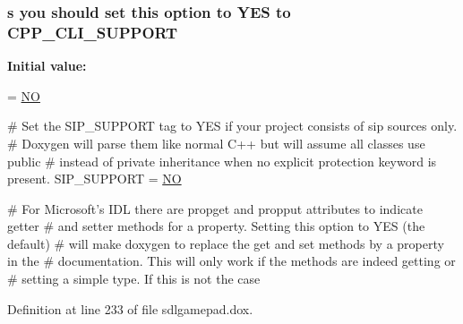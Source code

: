 \hypertarget{sdlgamepad_8dox_ad95e419f1790fce508581809c7b5dd7f}{
\subsubsection[{C\-P\-P\-\_\-\-C\-L\-I\-\_\-\-S\-U\-P\-P\-O\-R\-T}]{ {\bf s} you should {\bf set} this option to Y\-E\-S to C\-P\-P\-\_\-\-C\-L\-I\-\_\-\-S\-U\-P\-P\-O\-R\-T}}\label{sdlgamepad_8dox_ad95e419f1790fce508581809c7b5dd7f}
{\bfseries Initial value\-:}
\begin{DoxyCode}
= \hyperlink{sdlgamepad_8dox_a0f6a46245280dc38baf9600906aa1393}{NO}

\textcolor{preprocessor}{# Set the SIP\_SUPPORT tag to YES if your project consists of sip sources only.}
\textcolor{preprocessor}{}\textcolor{preprocessor}{# Doxygen will parse them like normal C++ but will assume all classes use public}
\textcolor{preprocessor}{}\textcolor{preprocessor}{# instead of private inheritance when no explicit protection keyword is present.}
\textcolor{preprocessor}{}
SIP\_SUPPORT            = \hyperlink{sdlgamepad_8dox_a0f6a46245280dc38baf9600906aa1393}{NO}

\textcolor{preprocessor}{# For Microsoft's IDL there are propget and propput attributes to indicate getter}
\textcolor{preprocessor}{}\textcolor{preprocessor}{# and setter methods for a property. Setting this option to YES (the default)}
\textcolor{preprocessor}{}\textcolor{preprocessor}{# will make doxygen to replace the get and set methods by a property in the}
\textcolor{preprocessor}{}\textcolor{preprocessor}{# documentation. This will only work if the methods are indeed getting or}
\textcolor{preprocessor}{# setting a simple type. If this is not the case}
\end{DoxyCode}


Definition at line 233 of file sdlgamepad.\-dox.

